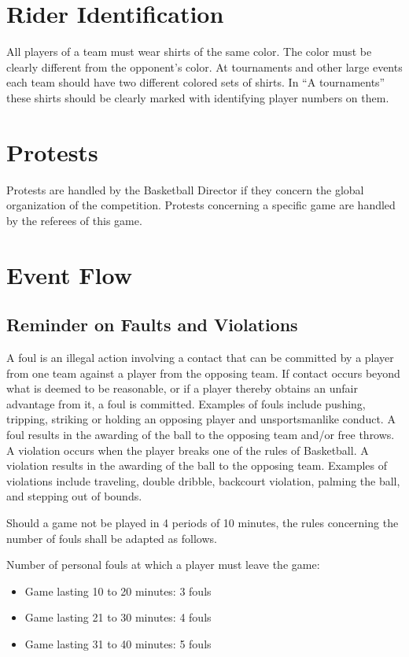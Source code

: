 \section{Rider Identification}

All players of a team must wear shirts of the same color.
The color must be clearly different from the opponent's color.
At tournaments and other large events each team should have two different colored sets of shirts. In ``A tournaments'' these shirts should be clearly marked with identifying player numbers on them.

\section{Protests}
Protests are handled by the Basketball Director if they concern the global organization of the competition.
Protests concerning a specific game are handled by the referees of this game.

\section{Event Flow}

\subsection{Reminder on Faults and Violations}
A foul is an illegal action involving a contact that can be committed by a player from one team against a player from the opposing team.
If contact occurs beyond what is deemed to be reasonable, or if a player thereby obtains an unfair advantage from it, a foul is committed.
Examples of fouls include pushing, tripping, striking or holding an opposing player and unsportsmanlike conduct.
A foul results in the awarding of the ball to the opposing team and/or free throws.
A violation occurs when the player breaks one of the rules of Basketball.
A violation results in the awarding of the ball to the opposing team.
Examples of violations include traveling, double dribble, backcourt violation, palming the ball, and stepping out of bounds.

Should a game not be played in 4 periods of 10 minutes, the rules concerning the number of fouls shall be adapted as follows.

Number of personal fouls at which a player must leave the game:
\begin{itemize}
  \item Game lasting 10 to 20 minutes: 3 fouls
  \item Game lasting 21 to 30 minutes: 4 fouls
  \item Game lasting 31 to 40 minutes: 5 fouls
\end{itemize}

